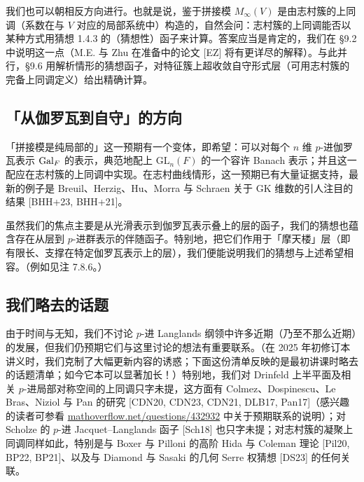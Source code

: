 我们也可以朝相反方向进行。也就是说，鉴于拼接模 $M_\infty(V)$ 是由志村簇的上同调（系数在与 $V$ 对应的局部系统中）构造的，自然会问：志村簇的上同调能否以某种方式用猜想 1.4.3 的（猜想性）函子来计算。答案应当是肯定的，我们在 §9.2 中说明这一点（M.E. 与 Zhu 在准备中的论文 [EZ] 将有更详尽的解释）。与此并行，§9.6 用解析情形的猜想函子，对特征簇上超收敛自守形式层（可用志村簇的完备上同调定义）给出精确计算。

\subsection{「从伽罗瓦到自守」的方向}

「拼接模是纯局部的」这一预期有一个变体，即希望：可以对每个 $n$ 维 $p$-进伽罗瓦表示 $\operatorname{Gal}_F$ 的表示，典范地配上 $\mathrm{GL}_n(F)$ 的一个容许 Banach 表示；并且这一配应在志村簇的上同调中实现。在志村曲线情形，这一预期已有大量证据支持，最新的例子是 Breuil、Herzig、Hu、Morra 与 Schraen 关于 GK 维数的引人注目的结果 [BHH+23, BHH+21]。

虽然我们的焦点主要是从光滑表示到伽罗瓦表示叠上的层的函子，我们的猜想也蕴含存在从层到 $p$-进群表示的伴随函子。特别地，把它们作用于「摩天楼」层（即有限长、支撑在特定伽罗瓦表示上的层），我们便能说明我们的猜想与上述希望相容。（例如见注 7.8.6。）

\subsection{我们略去的话题}

由于时间与无知，我们不讨论 $p$-进 Langlands 纲领中许多近期（乃至不那么近期）的发展，但我们仍预期它们与这里讨论的想法有重要联系。（在 2025 年初修订本讲义时，我们克制了大幅更新内容的诱惑；下面这份清单反映的是最初讲课时略去的话题清单；如今它本可以显著加长！）特别地，我们对 Drinfeld 上半平面及相关 $p$-进局部对称空间的上同调只字未提，这方面有 Colmez、Dospinescu、Le Bras、Niziol 与 Pan 的研究 [CDN20, CDN23, CDN21, DLB17, Pan17]（感兴趣的读者可参看 \href{https://mathoverflow.net/questions/432932/how-does-the-cohomology-of-the-lubin-tate-drinfeld-tower-fit-into-categorical-p}{mathoverflow.net/questions/432932} 中关于预期联系的说明）；对 Scholze 的 $p$-进 Jacquet--Langlands 函子 [Sch18] 也只字未提；对志村簇的凝聚上同调同样如此，特别是与 Boxer 与 Pilloni 的高阶 Hida 与 Coleman 理论 [Pil20, BP22, BP21]、以及与 Diamond 与 Sasaki 的几何 Serre 权猜想 [DS23] 的任何关联。

